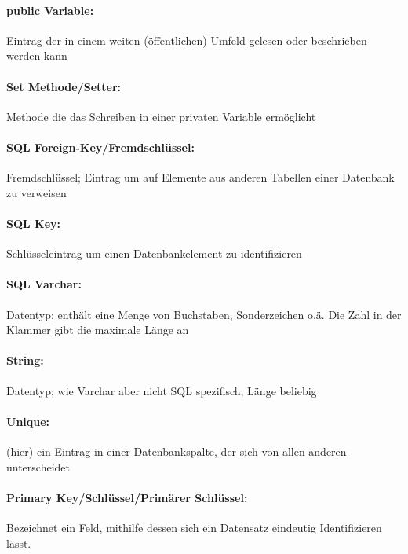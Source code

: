 \documentclass[12pt,parskip=full, pagea4]{scrreprt}
\begin{document}
    \paragraph{public Variable:} Eintrag der in einem weiten (öffentlichen) Umfeld gelesen oder beschrieben werden kann
    \paragraph{Set Methode/Setter:} Methode die das Schreiben in einer privaten Variable ermöglicht
    \paragraph{SQL Foreign-Key/Fremdschl\"ussel:} Fremdschlüssel; Eintrag um auf Elemente aus anderen Tabellen einer Datenbank zu verweisen
    \paragraph{SQL Key:} Schlüsseleintrag um einen Datenbankelement zu identifizieren
    \paragraph{SQL Varchar:} Datentyp; enthält eine Menge von Buchstaben, Sonderzeichen o.ä. Die Zahl in der Klammer gibt die maximale Länge an
    \paragraph{String:} Datentyp; wie Varchar aber nicht SQL spezifisch, Länge beliebig
    \paragraph{Unique:} (hier) ein Eintrag in einer Datenbankspalte, der sich von allen anderen unterscheidet
    \paragraph{Primary Key/Schl\"ussel/Prim\"arer Schl\"ussel:} Bezeichnet ein Feld, mithilfe dessen sich ein Datensatz eindeutig Identifizieren lässt.

		
\end{document}
